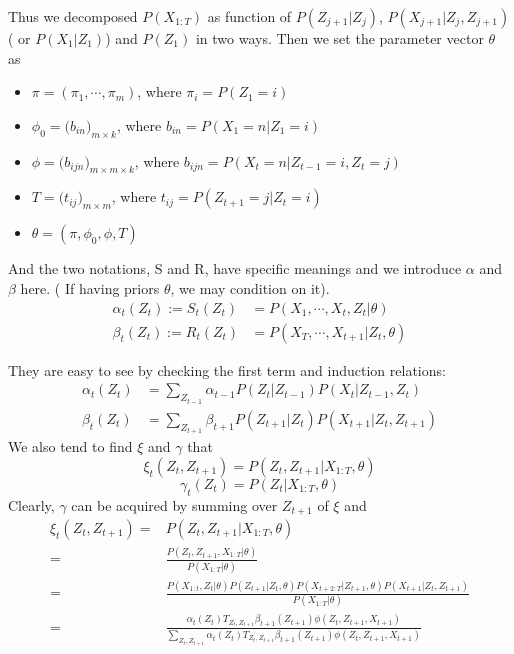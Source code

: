 \documentclass[10pt, oneside]{article}
\begin{document}
Thus we decomposed $P(X_{1:T})$ as function of $P(Z_{j+1}| Z_j)$, $P(X_{j+1}|Z_j, Z_{j+1})$( or $P(X_1|Z_1)$) and $P(Z_1)$ in two ways. Then we set the parameter vector $\theta$ as
\begin{itemize}
\item $\pi=( \pi_1, \cdots , \pi_m)$, where $\pi_i=P(Z_1=i)$
\item $\phi_0=\Big(b_{i n} \Big)_{m\times k}$, where $b_{in}=P(X_1=n|Z_1=i)$
\item $\phi=\big( b_{ijn} \big)_{m\times m\times k}$, where $b_{ijn}=P(X_t=n|Z_{t-1}=i,Z_t=j)$
\item $T=\Big (t_{ij}\Big)_{m\times m}$, where $t_{ij}=P(Z_{t+1}=j|Z_{t}=i)$
\item $\theta = (\pi, \phi_0, \phi, T)$
\end{itemize}

And the two notations, S and R, have specific meanings and we introduce $\alpha$ and $\beta$ here. ( If having priors $\theta$, we may condition on it).
$$
\begin{aligned}
\alpha_{t}(Z_t) := S_{t}(Z_t)&=P(X_1,\cdots, X_t,Z_t|\theta )\\
\beta_{t}(Z_t) := R_t (Z_t)&=P(X_{T},\cdots, X_{t+1}| Z_{t}, \theta)
\end{aligned}
$$

They are easy to see by checking the first term and induction relations:
$$
\begin{aligned}
\alpha_{t}(Z_t)&= \sum_{Z_{t-1}} \alpha_{t-1}P(Z_t|Z_{t-1})P(X_t|Z_{t-1}, Z_t)\\
\beta_t (Z_t)&=\sum_{Z_{t+1}} \beta_{t+1} P(Z_{t+1}|Z_t) P(X_{t+1}|Z_{t}, Z_{t+1})
\end{aligned}
$$
We also tend to find $\xi$ and $\gamma$ that
$$
\xi_t(Z_t, Z_{t+1})=P(Z_t, Z_{t+1}| X_{1:T}, \theta)
$$
$$
\gamma_t(Z_t)= P(Z_t | X_{1:T}, \theta)
$$
Clearly, $\gamma$ can be acquired by summing over $Z_{t+1}$ of $\xi$ and 
$$
\begin{aligned}
\xi_t(Z_t, Z_{t+1})=& P(Z_t, Z_{t+1}| X_{1:T}, \theta)\\
= & \frac{P(Z_t, Z_{t+1}, X_{1:T}|\theta )}{P(X_{1:T}|\theta )}\\
=& \frac{P(X_{1:t}, Z_t|\theta)P(Z_{t+1}|Z_t, \theta)P(X_{t+2:T}|Z_{t+1},\theta) P(X_{t+1}| Z_t, Z_{t+1})}{P(X_{1:T}|\theta )}\\
=&\frac{\alpha_t(Z_t) T_{Z_t, Z_{t+1}} \beta_{t+1}(Z_{t+1}) \phi(Z_t, Z_{t+1}, X_{t+1})}{\sum_{Z_t, Z_{t+1}} \alpha_t(Z_t) T_{Z_t, Z_{t+1}} \beta_{t+1}(Z_{t+1}) \phi(Z_t, Z_{t+1}, X_{t+1})}
\end{aligned}
$$
\end{document}
